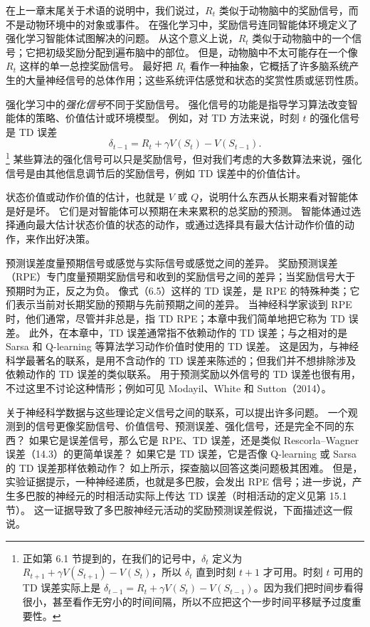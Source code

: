 \documentclass[UTF8,12pt,a4paper,fontset=fandol]{ctexart}
\begin{document}
在上一章末尾关于术语的说明中，我们说过，$R_t$ 类似于动物脑中的奖励信号，而不是动物环境中的对象或事件。
在强化学习中，奖励信号连同智能体环境定义了强化学习智能体试图解决的问题。
从这个意义上说，$R_t$ 类似于动物脑中的一个信号；它把初级奖励分配到遍布脑中的部位。
但是，动物脑中不太可能存在一个像 $R_t$ 这样的单一总控奖励信号。
最好把 $R_t$ 看作一种抽象，它概括了许多脑系统产生的大量神经信号的总体作用；这些系统评估感觉和状态的奖赏性质或惩罚性质。

强化学习中的\textit{强化信号}不同于奖励信号。
强化信号的功能是指导学习算法改变智能体的策略、价值估计或环境模型。
例如，对 TD 方法来说，时刻 $t$ 的强化信号是 TD 误差
\[
\delta_{t-1}=R_t+\gamma V(S_t)-V(S_{t-1}).
\]
\footnote{正如第 6.1 节提到的，在我们的记号中，$\delta_t$ 定义为 $R_{t+1}+\gamma V(S_{t+1})-V(S_t)$，所以 $\delta_t$ 直到时刻 $t+1$ 才可用。时刻 $t$ 可用的 TD 误差实际上是 $\delta_{t-1}=R_t+\gamma V(S_t)-V(S_{t-1})$。因为我们把时间步看得很小，甚至看作无穷小的时间间隔，所以不应把这个一步时间平移赋予过度重要性。}
某些算法的强化信号可以只是奖励信号，但对我们考虑的大多数算法来说，强化信号是由其他信息调节后的奖励信号，例如 TD 误差中的价值估计。

状态价值或动作价值的估计，也就是 $V$ 或 $Q$，说明什么东西从长期来看对智能体是好是坏。
它们是对智能体可以预期在未来累积的总奖励的预测。
智能体通过选择通向最大估计状态价值的状态的动作，或通过选择具有最大估计动作价值的动作，来作出好决策。

预测误差度量预期信号或感觉与实际信号或感觉之间的差异。
奖励预测误差（RPE）专门度量预期奖励信号和收到的奖励信号之间的差异；当奖励信号大于预期时为正，反之为负。
像式（6.5）这样的 TD 误差，是 RPE 的特殊种类；它们表示当前对长期奖励的预期与先前预期之间的差异。
当神经科学家谈到 RPE 时，他们通常，尽管并非总是，指 TD RPE；本章中我们简单地把它称为 TD 误差。
此外，在本章中，TD 误差通常指不依赖动作的 TD 误差；与之相对的是 Sarsa 和 Q-learning 等算法学习动作价值时使用的 TD 误差。
这是因为，与神经科学最著名的联系，是用不含动作的 TD 误差来陈述的；但我们并不想排除涉及依赖动作的 TD 误差的类似联系。
用于预测奖励以外信号的 TD 误差也很有用，不过这里不讨论这种情形；例如可见 Modayil、White 和 Sutton（2014）。

关于神经科学数据与这些理论定义信号之间的联系，可以提出许多问题。
一个观测到的信号更像奖励信号、价值信号、预测误差、强化信号，还是完全不同的东西？
如果它是误差信号，那么它是 RPE、TD 误差，还是类似 Rescorla--Wagner 误差（14.3）的更简单误差？
如果它是 TD 误差，它是否像 Q-learning 或 Sarsa 的 TD 误差那样依赖动作？
如上所示，探查脑以回答这类问题极其困难。
但是，实验证据提示，一种神经递质，也就是多巴胺，会发出 RPE 信号；进一步说，产生多巴胺的神经元的时相活动实际上传达 TD 误差（时相活动的定义见第 15.1 节）。
这一证据导致了多巴胺神经元活动的奖励预测误差假说，下面描述这一假说。
\end{document}
